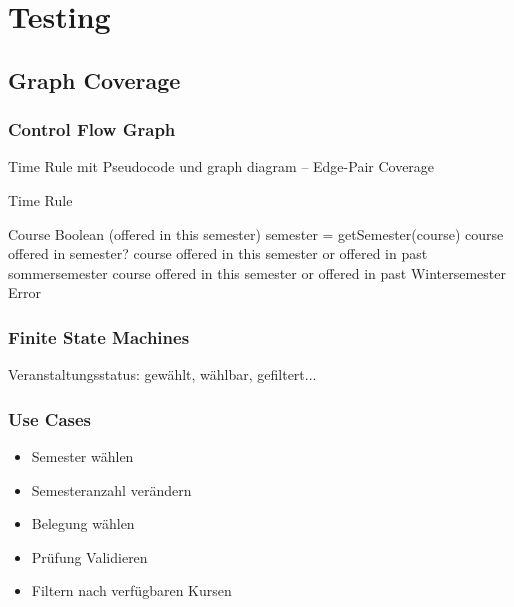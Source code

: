 \documentclass[ngerman]{article}
\begin{document}
\section{Testing}

\subsection{Graph Coverage}

\subsubsection{Control Flow Graph}
Time Rule mit Pseudocode und graph diagram -- Edge-Pair Coverage
\begin{algorithm}
\caption{Time Rule}
\begin{algorithmic}[1]
     Course
    \ENSURE Boolean (offered in this semester)
    \STATE semester = getSemester(course)
        \RETURN course offered in semester?
    \ELSE 
    			\RETURN course offered in this semester or offered in past sommersemester
    		\ELSE
    				\RETURN course offered in this semester or offered in past Wintersemester 
    			\ELSE 
    				\RETURN Error
    			\ENDIF
    		\ENDIF
    \ENDIF
\end{algorithmic}
\end{algorithm}

\subsubsection{Finite State Machines}
Veranstaltungsstatus: gewählt, wählbar, gefiltert...


\subsubsection{Use Cases}

\begin{itemize}
    \item Semester wählen
    \item Semesteranzahl verändern
    \item Belegung wählen
    \item Prüfung Validieren
    \item Filtern nach verfügbaren Kursen
\end{itemize}
\end{document}
